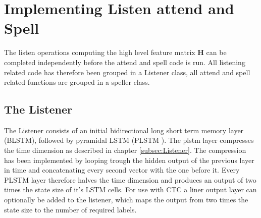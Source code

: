 \section{Implementing Listen attend and Spell}
The listen operations computing the high level feature matrix $\mathbf{H}$ can be completed independently before the attend and spell code is run. All listening related code has therefore been grouped in a Listener class, all attend and spell related functions are grouped in a speller class.

\subsection{The Listener}
The Listener consists of an initial bidirectional long short term memory layer (BLSTM), followed by pyramidal LSTM (PLSTM ). The plstm layer compresses the time dimension as described in chapter \ref{subsec:Listener}. The compression has been implemented by looping trough the hidden output of the previous layer in time and concatenating every second vector with the one before it. Every PLSTM layer therefore halves the time dimension and produces an output of two times the state size of it's LSTM cells. 
For use with CTC a liner output layer can optionally be added to the listener, which maps the output from two times the state size to the number of required labels. 


